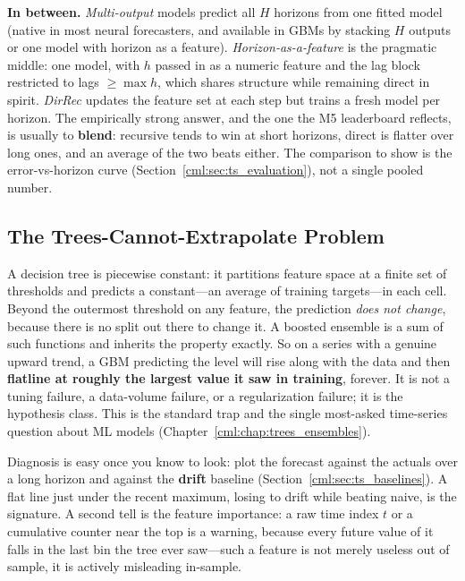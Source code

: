 \textbf{In between.} \emph{Multi-output} models predict all $H$ horizons from one fitted model (native in most neural forecasters, and available in GBMs by stacking $H$ outputs or one model with horizon as a feature). \emph{Horizon-as-a-feature} is the pragmatic middle: one model, with $h$ passed in as a numeric feature and the lag block restricted to lags $\ge \max h$, which shares structure while remaining direct in spirit. \emph{DirRec} updates the feature set at each step but trains a fresh model per horizon. The empirically strong answer, and the one the M5 leaderboard reflects, is usually to \textbf{blend}: recursive tends to win at short horizons, direct is flatter over long ones, and an average of the two beats either. The comparison to show is the error-vs-horizon curve (Section~\ref{cml:sec:ts_evaluation}), not a single pooled number.

\subsection{The Trees-Cannot-Extrapolate Problem}

\begin{keyinsight}
A decision tree is piecewise constant: it partitions feature space at a finite set of thresholds and predicts a constant---an average of training targets---in each cell. Beyond the outermost threshold on any feature, the prediction \emph{does not change}, because there is no split out there to change it. A boosted ensemble is a sum of such functions and inherits the property exactly. So on a series with a genuine upward trend, a GBM predicting the level will rise along with the data and then \textbf{flatline at roughly the largest value it saw in training}, forever. It is not a tuning failure, a data-volume failure, or a regularization failure; it is the hypothesis class. This is the standard trap and the single most-asked time-series question about ML models (Chapter~\ref{cml:chap:trees_ensembles}).
\end{keyinsight}

Diagnosis is easy once you know to look: plot the forecast against the actuals over a long horizon and against the \textbf{drift} baseline (Section~\ref{cml:sec:ts_baselines}). A flat line just under the recent maximum, losing to drift while beating naive, is the signature. A second tell is the feature importance: a raw time index $t$ or a cumulative counter near the top is a warning, because every future value of it falls in the last bin the tree ever saw---such a feature is not merely useless out of sample, it is actively misleading in-sample.

